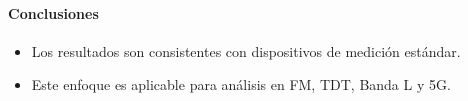 \paragraph{Conclusiones}

\begin{itemize}
	\item Los resultados son consistentes con dispositivos de medici\'on est\'andar.
	\item Este enfoque es aplicable para an\'alisis en FM, TDT, Banda L y 5G.
\end{itemize}
